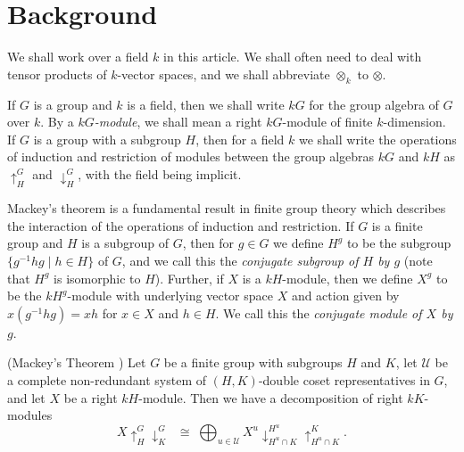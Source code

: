 \section{Background}
We shall work over a field $k$ in this article. We shall often need to deal with tensor products of $k$-vector spaces, and we shall
abbreviate $\otimes_k$ to $\otimes$.

If $G$ is a group and $k$ is a field, then we shall write $kG$ for the group algebra of $G$ over $k$. By a \textit{$kG$-module}, we shall
mean a right $kG$-module of finite $k$-dimension.
If $G$ is a group with a subgroup $H$, then for a field $k$ we shall write the operations of induction and restriction of modules
between the group algebras $kG$ and $kH$ as $\uparrow^{G}_{H}$ and $\downarrow^{G}_{H}$, with the field being implicit.

Mackey's theorem is a fundamental result in finite group theory which describes the interaction of the operations of induction and
restriction. If $G$ is a finite group and $H$ is a subgroup of $G$, then for $g \in G$ we define $H^g$ to be the subgroup
$\{g^{-1}hg \mid h \in H\}$ of $G$, and we call this the \textit{conjugate subgroup of $H$ by $g$} (note that $H^g$ is isomorphic to $H$).
Further, if $X$ is a $kH$-module, then we define $X^g$ to be the $kH^g$-module with underlying vector space $X$ and action given by
$x(g^{-1}hg) = xh$ for $x \in X$ and $h \in H$. We call this the \textit{conjugate module of $X$ by $g$}.

\begin{theo}\label{mackey:thm}\textup{(}Mackey's Theorem \cite[Theorem 3.3.4]{BRCI}\textup{)}
Let $G$ be a finite group with subgroups $H$ and $K$, let $\mathcal{U}$ be a complete non-redundant system of $(H,K)$-double coset
representatives in $G$, and let $X$ be a right $kH$-module. Then we have a decomposition of right $kK$-modules
\[
X\!\uparrow^{G}_{H}\downarrow^{G}_{K} \;\;\cong\;
\bigoplus_{u \in \mathcal{U}} X^u\downarrow^{H^u}_{H^u\cap K}\uparrow^{K}_{H^u\cap K}.
\]
\end{theo}

